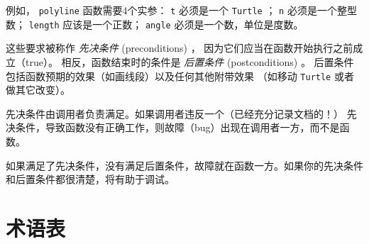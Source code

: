 例如， \lstinline{polyline} 函数需要4个实参： \lstinline{t} 必须是一个 \lstinline{Turtle} ；
\lstinline{n} 必须是一个整型数； \lstinline{length} 应该是一个正数；
\lstinline{angle} 必须是一个数，单位是度数。


这些要求被称作 \emph{先决条件} (preconditions) ，
因为它们应当在函数开始执行之前成立（true）。
相反，函数结束时的条件是 \emph{后置条件} (postconditions) 。
后置条件包括函数预期的效果（如画线段）以及任何其他附带效果
（如移动 \lstinline{Turtle} 或者做其它改变）。
  


先决条件由调用者负责满足。如果调用者违反一个（已经充分记录文档的！）
先决条件，导致函数没有正确工作，则故障（bug）出现在调用者一方，而不是函数。


如果满足了先决条件，没有满足后置条件，故障就在函数一方。如果你的先决条件和后置条件都很清楚，将有助于调试。


\section{术语表}

